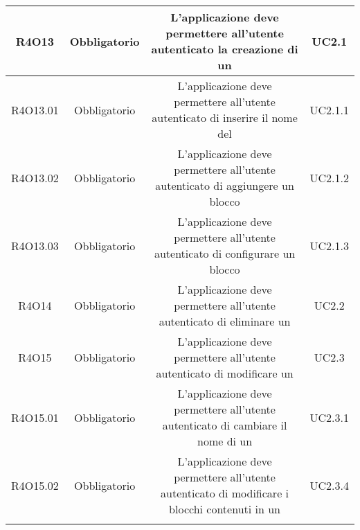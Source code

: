 \begin{tabularx}{\textwidth}{|C|C|C|C|}
	\hline
	R4O13&Obbligatorio&L'applicazione deve permettere all'utente autenticato la creazione di un&  UC2.1\\
	\hline
	R4O13.01&Obbligatorio& L'applicazione deve permettere all'utente autenticato di inserire il nome del  & UC2.1.1\\
	\hline
	R4O13.02&Obbligatorio&L'applicazione deve permettere all'utente autenticato di aggiungere un blocco &  UC2.1.2\\
	\hline	
	R4O13.03&Obbligatorio&L'applicazione deve permettere all'utente autenticato di configurare un blocco&UC2.1.3\\
	\hline
	R4O14&Obbligatorio&L'applicazione deve permettere all'utente autenticato di eliminare un&UC2.2\\
	\hline
	R4O15&Obbligatorio& L'applicazione deve permettere all'utente autenticato di  modificare un  &UC2.3\\
	\hline
	R4O15.01&Obbligatorio& L'applicazione deve permettere all'utente autenticato di cambiare il nome di un  &UC2.3.1\\
	\hline
	R4O15.02&Obbligatorio& L'applicazione deve permettere all'utente autenticato di modificare i blocchi contenuti in un  &UC2.3.4\\
	\hline
	\caption{Tabella requisiti di vincolo}
\end{tabularx}

\newpage
